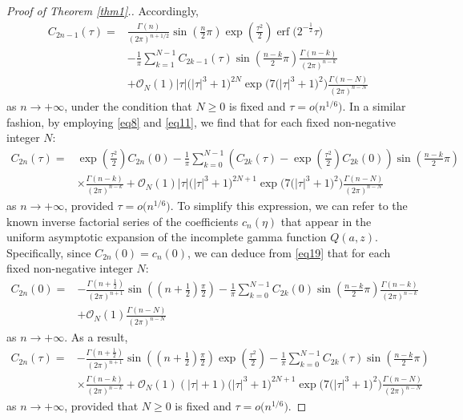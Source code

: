 \documentclass[11pt]{article}
\numberwithin{equation}{section}
\def\erf{\operatorname{erf}}
\numberwithin{equation}{section}
\begin{document}
\begin{proof}[Proof of Theorem \ref{thm1}.]
Accordingly,
\begin{align}
C_{2n - 1} (\tau ) ={}& \frac{\Gamma (n)}{(2\pi )^{n + 1/2} }\sin \left( \frac{n}{2}\pi \right)\exp \left( \frac{\tau ^2}{2} \right)\erf\big( 2^{ - \frac{1}{2}} \tau \big)\nonumber\\
& - \frac{1}{\pi}\sum_{k = 1}^{N - 1} C_{2k - 1} (\tau )\sin \left( \frac{n - k}{2}\pi \right)\frac{\Gamma (n - k)}{(2\pi )^{n - k} }\nonumber
\\ & +\mathcal{O}_N (1)\left| \tau \right|\bigl(\left| \tau \right|^3 + 1\bigr)^{2N} \exp \big( 7\bigl(\left| \tau \right|^3 + 1\bigr)^2 \big) \frac{\Gamma (n - N)}{(2\pi )^{n - N}}\label{eq12}
\end{align}
as $n\to+\infty$, under the condition that $N\ge 0$ is fixed and $\tau = o\big(n^{1/6}\big)$. In a similar fashion, by employing \eqref{eq8} and \eqref{eq11}, we find that for each fixed non-negative integer $N$:
\begin{align*}
C_{2n} (\tau ) ={}& \exp \left( \frac{\tau ^2}{2} \right)C_{2n} (0) - \frac{1}{\pi}\sum_{k = 0}^{N - 1} \left( C_{2k} (\tau ) - \exp \left( \frac{\tau ^2}{2} \right)C_{2k} (0) \right)\sin \left( \frac{n - k}{2}\pi \right)
\\ &\times\frac{\Gamma (n - k)}{(2\pi )^{n - k}} + \mathcal{O}_N (1)\left| \tau \right|\bigl(\left| \tau \right|^3 + 1\bigr)^{2N + 1} \exp \big( 7\bigl(\left| \tau \right|^3 + 1\bigr)^2 \big)\frac{\Gamma (n - N)}{(2\pi )^{n - N}}
\end{align*}
as $n\to+\infty$, provided $\tau = o\big(n^{1/6}\big)$. To simplify this expression, we can refer to the known inverse factorial series of the coefficients $c_n(\eta)$ that appear in the uniform asymptotic expansion of the incomplete gamma function $Q(a,z)$. Specifically, since $C_{2n}(0)=c_n(0)$, we can deduce from \eqref{eq19} that for each fixed non-negative integer $N$:
\begin{align*}
C_{2n} (0) ={}& - \frac{\Gamma \left( n + \frac{1}{2} \right)}{(2\pi )^{n + 1}}\sin \left( \left(n + \frac{1}{2}\right)\frac{\pi}{2} \right) - \frac{1}{\pi }\sum_{k = 0}^{N - 1} C_{2k} (0)\sin \left( \frac{n - k}{2}\pi \right)\frac{\Gamma (n - k)}{(2\pi )^{n - k}} \\ & + \mathcal{O}_N(1)\frac{\Gamma (n - N)}{(2\pi )^{n - N} }
\end{align*}
as $n\to+\infty$. As a result,
\begin{align}
C_{2n} (\tau ) ={}& -\frac{\Gamma \left( n + \frac{1}{2} \right)}{(2\pi )^{n + 1} }\sin \left( \left( n + \frac{1}{2} \right)\frac{\pi }{2} \right)\exp \left( \frac{\tau ^2}{2} \right) - \frac{1}{\pi }\sum\limits_{k = 0}^{N-1} C_{2k} (\tau )\sin \left( \frac{n - k}{2}\pi \right)\nonumber
\\ &\times\frac{\Gamma (n - k)}{(2\pi )^{n - k} } + \mathcal{O}_N (1)(\left| \tau \right|+1)\bigl(\left| \tau \right|^3 + 1\bigr)^{2N + 1} \exp \big( 7\bigl(\left| \tau \right|^3 + 1\bigr)^2 \big)\frac{\Gamma (n - N)}{(2\pi )^{n - N}}\label{eq13}
\end{align}
as $n\to+\infty$, provided that $N\ge 0$ is fixed and $\tau = o\big(n^{1/6}\big)$.


\end{proof}
\end{document}

